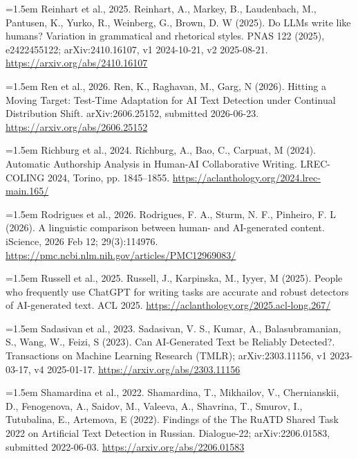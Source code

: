 \documentclass[11pt,a4paper]{article}
\renewcommand{\_}{\textunderscore\allowbreak}
\begin{document}
\noindent\hangindent=1.5em Reinhart et al., 2025. Reinhart, A., Markey, B., Laudenbach, M., Pantusen, K., Yurko, R., Weinberg, G., Brown, D. W (2025). Do LLMs write like humans? Variation in grammatical and rhetorical styles. PNAS 122 (2025), e2422455122; arXiv:2410.16107, v1 2024-10-21, v2 2025-08-21. \url{https://arxiv.org/abs/2410.16107}\par\smallskip

\noindent\hangindent=1.5em Ren et al., 2026. Ren, K., Raghavan, M., Garg, N (2026). Hitting a Moving Target: Test-Time Adaptation for AI Text Detection under Continual Distribution Shift. arXiv:2606.25152, submitted 2026-06-23. \url{https://arxiv.org/abs/2606.25152}\par\smallskip

\noindent\hangindent=1.5em Richburg et al., 2024. Richburg, A., Bao, C., Carpuat, M (2024). Automatic Authorship Analysis in Human-AI Collaborative Writing. LREC-COLING 2024, Torino, pp. 1845–1855. \url{https://aclanthology.org/2024.lrec-main.165/}\par\smallskip

\noindent\hangindent=1.5em Rodrigues et al., 2026. Rodrigues, F. A., Sturm, N. F., Pinheiro, F. L (2026). A linguistic comparison between human- and AI-generated content. iScience, 2026 Feb 12; 29(3):114976. \url{https://pmc.ncbi.nlm.nih.gov/articles/PMC12969083/}\par\smallskip

\noindent\hangindent=1.5em Russell et al., 2025. Russell, J., Karpinska, M., Iyyer, M (2025). People who frequently use ChatGPT for writing tasks are accurate and robust detectors of AI-generated text. ACL 2025. \url{https://aclanthology.org/2025.acl-long.267/}\par\smallskip

\noindent\hangindent=1.5em Sadasivan et al., 2023. Sadasivan, V. S., Kumar, A., Balasubramanian, S., Wang, W., Feizi, S (2023). Can AI-Generated Text be Reliably Detected?. Transactions on Machine Learning Research (TMLR); arXiv:2303.11156, v1 2023-03-17, v4 2025-01-17. \url{https://arxiv.org/abs/2303.11156}\par\smallskip

\noindent\hangindent=1.5em Shamardina et al., 2022. Shamardina, T., Mikhailov, V., Chernianskii, D., Fenogenova, A., Saidov, M., Valeeva, A., Shavrina, T., Smurov, I., Tutubalina, E., Artemova, E (2022). Findings of the The RuATD Shared Task 2022 on Artificial Text Detection in Russian. Dialogue-22; arXiv:2206.01583, submitted 2022-06-03. \url{https://arxiv.org/abs/2206.01583}\par\smallskip
\end{document}
